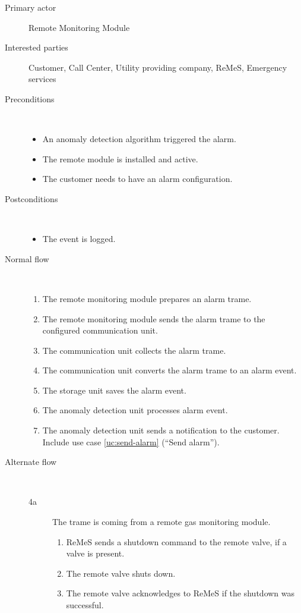 \begin{description}
	\item[Primary actor] Remote Monitoring Module
	\item[Interested parties] Customer, Call Center, Utility providing company,
	ReMeS, Emergency services
	\item[Preconditions] \ 
	\begin{itemize}
	  	\item An anomaly detection algorithm triggered the alarm.
		\item The remote module is installed and active.
		\item The customer needs to have an alarm configuration.
	\end{itemize}
	\item[Postconditions] \ 
	\begin{itemize}
		\item The event is logged.
	\end{itemize}
	\item[Normal flow] \ 
	\begin{enumerate}
	  	\item The remote monitoring module prepares an alarm trame.
	  	\item The remote monitoring module sends the alarm trame to the configured
	  	communication unit. 
	  	\item The communication unit collects the alarm trame.
		\item The communication unit converts the alarm trame to an alarm event.
		\item The storage unit saves the alarm event.
	  	\item The anomaly detection unit processes alarm event.
	  	\item The anomaly detection unit sends a notification to the customer.
	  	Include use case \ref{uc:send-alarm} (``Send alarm'').
	\end{enumerate}
	\item[Alternate flow] \ 
	\begin{description}
		\item[4a] The trame is coming from a remote gas monitoring module.
			\begin{enumerate}
				\item ReMeS sends a shutdown command to the remote valve, if a valve is
				present.
				\item The remote valve shuts down.
				\item The remote valve acknowledges to ReMeS if the shutdown was successful.

\end{enumerate}
\end{description}
\end{description}
